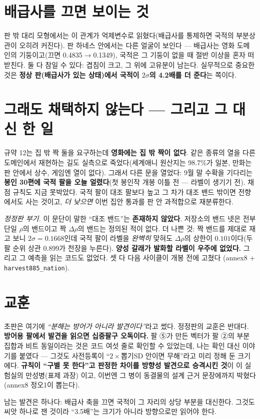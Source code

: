 \documentclass[10pt]{article}
\begin{document}
\section{배급사를 끄면 보이는 것}

판 밖 대리 모형에서는 이 관계가 억제변수로 읽혔다(배급사를 통제하면
국적의 부분상관이 오히려 커진다). 판 하네스 안에서는 다른 얼굴이
보인다 --- 배급사는 영화 도메인의 기둥이고(끄면 0.4835$\to$0.1349),
국적은 그 기둥이 없을 때 절반 이상을 혼자 떠받친다. 둘 다 참일 수
있다: 겹침이 크고, 그 위에 고유분이 남는다. 실무적으로 중요한 것은
\textbf{정상 판(배급사가 있는 상태)에서 국적이 $2\sigma$의 4.2배를
더 준다}는 쪽이다.

\section{그래도 채택하지 않는다 --- 그리고 그 대신 한 일}

규약 12는 집 밖 짝 둘을 요구하는데 \textbf{영화에는 집 밖 짝이
없다}. 같은 종류의 열을 다른 도메인에서 재현하는 길도 실측으로
죽었다(세계애니 원산지는 98.7\%가 일본, 만화는 판 안에서 상수,
게임엔 열이 없다). 그래서 다른 문을 열었다: 9월 말 수확을 기다리는
\textbf{봉인 30편에 국적 팔을 오늘 얼렸다}(첫 봉인작 개봉 이틀
전 --- 라벨이 생기기 전). 채점 규칙도 지금 못박았다. 국적 팔이 대조
팔보다 높고 그 차가 대조 밴드 밖이면 전향에서도 사는 것이고,
\emph{더 낮으면} 이번 집안 통과를 판 안 과적합으로 재분류한다.

\emph{정정판 부기.} 이 문단이 말한 ``대조 밴드''는 \textbf{존재하지
않았다}. 저장소의 밴드 넷은 전부 단일 $\rho$의 밴드이고 짝 $\Delta\rho$의
밴드는 정의된 적이 없다. 더 나쁜 것: 짝 밴드를 제대로 재고 보니
$2\sigma = 0.1668$인데 국적 팔이 라벨을 \emph{완벽히} 맞혀도
$\Delta\rho$의 상한이 $0.101$이다(두 팔 순위 상관 0.899가 천장을
누른다). \textbf{양성 갈래가 발화할 라벨이 우주에 없었다.} 그리고
그 예측을 읽는 코드도 없었다. 셋 다 다음 사이클이 개봉 전에 고쳤다
(annex8 + \texttt{harvest885\_nation}).

\section{교훈}

초판은 여기에 \emph{``분해는 방어가 아니라 발견이다''}라고 썼다.
정정판의 교훈은 반대다. \textbf{방어용 팔에서 발견을 읽으면 십중팔구
오독이다.} 팔 ⑤가 만든 벡터가 팔 ②의 부분집합과 비트 동일이라는
것은 코드 여섯 줄로 확인할 수 있었는데, 나는 확인 대신 이야기를
붙였다 --- 그것도 사전등록이 ``$2\times$뽑기SD 안이면 무해''라고
미리 정해 둔 크기에다. \textbf{규칙이 ``구별 못 한다''고 판정한
차이를 방향성 발견으로 승격시킨 것}이 이 실험실의 만성병(표제 과장)
이고, 이번엔 그 병이 동결물의 설계 근거 문장에까지 박혔다
(annex8 정오1이 뽑는다).

남는 발견은 하나다: 배급사 축을 끄면 국적이 그 자리의 상당 부분을
대신한다. 그것도 씨앗 하나로 잰 것이라 ``3.5배''는 크기가 아니라
방향으로만 읽어야 한다.
\end{document}
